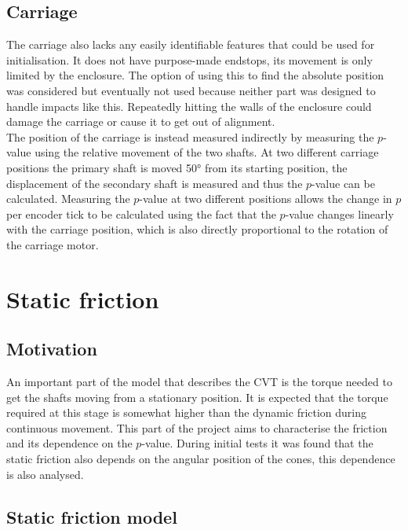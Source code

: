 \documentclass[12pt]{article}
\begin{document}
\subsection{Carriage}
The carriage also lacks any easily identifiable features that could be used for initialisation. It does not have purpose-made endstops, its movement is only limited by the enclosure. The option of using this to find the absolute position was considered but eventually not used because neither part was designed to handle impacts like this. Repeatedly hitting the walls of the enclosure could damage the carriage or cause it to get out of alignment.\\

The position of the carriage is instead measured indirectly by measuring the $p$-value using the relative movement of the two shafts. At two different carriage positions the primary shaft is moved 50° from its starting position, the displacement of the secondary shaft is measured and thus the $p$-value can be calculated. Measuring the $p$-value at two different positions allows the change in $p$ per encoder tick to be calculated using the fact that the $p$-value changes linearly with the carriage position, which is also directly proportional to the rotation of the carriage motor. 
 

\pagebreak
\section{Static friction}
\subsection{Motivation}
An important part of the model that describes the CVT is the torque needed to get the shafts moving from a stationary position. It is expected that the torque required at this stage is somewhat higher than the dynamic friction during continuous movement. This part of the project aims to characterise the friction and its dependence on the $p$-value. During initial tests it was found that the static friction also depends on the angular position of the cones, this dependence is also analysed. 





\subsection{Static friction model}
\label{sec:staticFricTheory}
\end{document}
